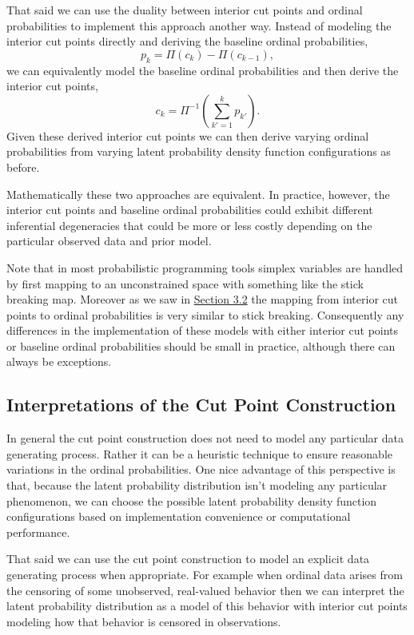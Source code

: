 \documentclass[
  letterpaper,
  DIV=11,
  numbers=noendperiod]{scrartcl}
\begin{document}
That said we can use the duality between interior cut points and ordinal
probabilities to implement this approach another way. Instead of
modeling the interior cut points directly and deriving the baseline
ordinal probabilities, \[
p_{k} = \Pi(c_{k}) - \Pi(c_{k - 1}),
\] we can equivalently model the baseline ordinal probabilities and then
derive the interior cut points, \[
c_{k}
=
\Pi^{-1} \left( \sum_{k' = 1}^{k} p_{k'} \right).
\] Given these derived interior cut points we can then derive varying
ordinal probabilities from varying latent probability density function
configurations as before.

Mathematically these two approaches are equivalent. In practice,
however, the interior cut points and baseline ordinal probabilities
could exhibit different inferential degeneracies that could be more or
less costly depending on the particular observed data and prior model.

Note that in most probabilistic programming tools simplex variables are
handled by first mapping to an unconstrained space with something like
the stick breaking map. Moreover as we saw in
\hyperref[sec:duality]{Section 3.2} the mapping from interior cut points
to ordinal probabilities is very similar to stick breaking. Consequently
any differences in the implementation of these models with either
interior cut points or baseline ordinal probabilities should be small in
practice, although there can always be exceptions.

\subsection{Interpretations of the Cut Point
Construction}\label{interpretations-of-the-cut-point-construction}

In general the cut point construction does not need to model any
particular data generating process. Rather it can be a heuristic
technique to ensure reasonable variations in the ordinal probabilities.
One nice advantage of this perspective is that, because the latent
probability distribution isn't modeling any particular phenomenon, we
can choose the possible latent probability density function
configurations based on implementation convenience or computational
performance.

That said we can use the cut point construction to model an explicit
data generating process when appropriate. For example when ordinal data
arises from the censoring of some unobserved, real-valued behavior then
we can interpret the latent probability distribution as a model of this
behavior with interior cut points modeling how that behavior is censored
in observations.
\end{document}
